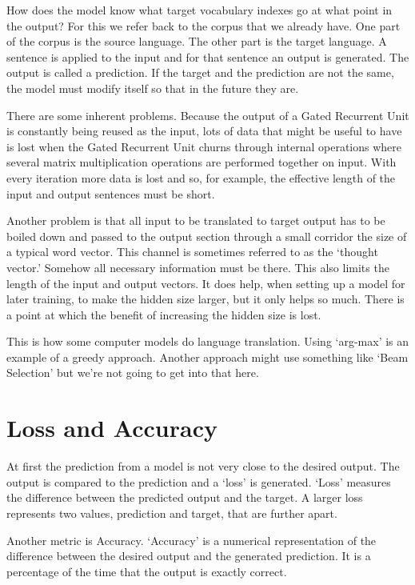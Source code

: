 How does the model know what target vocabulary indexes go at what point in the output? For this we refer back to the corpus that we already have. One part of the corpus is the source language. The other part is the target language. A sentence is applied to the input and for that sentence an output is generated. The output is called a prediction. If the target and the prediction are not the same, the model must modify itself so that in the future they are.

There are some inherent problems. Because the output of a Gated Recurrent Unit is constantly being reused as the input, lots of data that might be useful to have is lost when the Gated Recurrent Unit churns through internal operations where several matrix multiplication operations are performed together on input. With every iteration more data is lost and so, for example, the effective length of the input and output sentences must be short. 

Another problem is that all input to be translated to target output has to be boiled down and passed to the output section through a small corridor the size of a typical word vector. This channel is sometimes referred to as the `thought vector.' Somehow all necessary information must be there. This also limits the length of the input and output vectors. It does help, when setting up a model for later training, to make the hidden size larger, but it only helps so much. There is a point at which the benefit of increasing the hidden size is lost.

This is how some computer models do language translation. Using `arg-max' is an example of a greedy approach. Another approach might use something like `Beam Selection' but we're not going to get into that here.


\section{Loss and Accuracy}

At first the prediction from a model is not very close to the desired output. The output is compared to the prediction and a `loss' is generated. `Loss' measures the difference between the predicted output and the target. A larger loss represents two values, prediction and target, that are further apart. 


Another metric is Accuracy. `Accuracy' is a numerical representation of the difference between the desired output and the generated prediction. It is a percentage of the time that the output is exactly correct.


